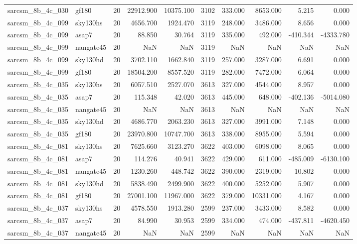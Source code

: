 \begin{longtable}{llrrrrrrrr}
sarcsm\_8b\_4c\_030 & gf180 & 20 & 22912.900 & 10375.100 & 3102 & 333.000 & 8653.000 & 5.215 & 0.000 \\
sarcsm\_8b\_4c\_099 & sky130hs & 20 & 4656.700 & 1924.470 & 3119 & 248.000 & 3486.000 & 8.656 & 0.000 \\
sarcsm\_8b\_4c\_099 & asap7 & 20 & 88.850 & 30.764 & 3119 & 335.000 & 492.000 & -410.344 & -4333.780 \\
sarcsm\_8b\_4c\_099 & nangate45 & 20 & NaN & NaN & 3119 & NaN & NaN & NaN & NaN \\
sarcsm\_8b\_4c\_099 & sky130hd & 20 & 3702.110 & 1662.840 & 3119 & 257.000 & 3287.000 & 6.691 & 0.000 \\
sarcsm\_8b\_4c\_099 & gf180 & 20 & 18504.200 & 8557.520 & 3119 & 282.000 & 7472.000 & 6.064 & 0.000 \\
sarcsm\_8b\_4c\_035 & sky130hs & 20 & 6057.510 & 2527.070 & 3613 & 327.000 & 4544.000 & 8.957 & 0.000 \\
sarcsm\_8b\_4c\_035 & asap7 & 20 & 115.348 & 42.020 & 3613 & 445.000 & 648.000 & -402.136 & -5014.080 \\
sarcsm\_8b\_4c\_035 & nangate45 & 20 & NaN & NaN & 3613 & NaN & NaN & NaN & NaN \\
sarcsm\_8b\_4c\_035 & sky130hd & 20 & 4686.770 & 2063.230 & 3613 & 327.000 & 3991.000 & 7.148 & 0.000 \\
sarcsm\_8b\_4c\_035 & gf180 & 20 & 23970.800 & 10747.700 & 3613 & 338.000 & 8955.000 & 5.594 & 0.000 \\
sarcsm\_8b\_4c\_081 & sky130hs & 20 & 7625.660 & 3123.270 & 3622 & 403.000 & 6098.000 & 8.065 & 0.000 \\
sarcsm\_8b\_4c\_081 & asap7 & 20 & 114.276 & 40.941 & 3622 & 429.000 & 611.000 & -485.009 & -6130.100 \\
sarcsm\_8b\_4c\_081 & nangate45 & 20 & 1230.260 & 448.742 & 3622 & 390.000 & 2319.000 & 10.802 & 0.000 \\
sarcsm\_8b\_4c\_081 & sky130hd & 20 & 5838.490 & 2499.900 & 3622 & 400.000 & 5252.000 & 5.907 & 0.000 \\
sarcsm\_8b\_4c\_081 & gf180 & 20 & 27001.100 & 11967.000 & 3622 & 379.000 & 10331.000 & 4.167 & 0.000 \\
sarcsm\_8b\_4c\_037 & sky130hs & 20 & 4578.550 & 1913.280 & 2599 & 237.000 & 3433.000 & 8.582 & 0.000 \\
sarcsm\_8b\_4c\_037 & asap7 & 20 & 84.990 & 30.953 & 2599 & 334.000 & 474.000 & -437.811 & -4620.450 \\
sarcsm\_8b\_4c\_037 & nangate45 & 20 & NaN & NaN & 2599 & NaN & NaN & NaN & NaN \\

\end{longtable}
